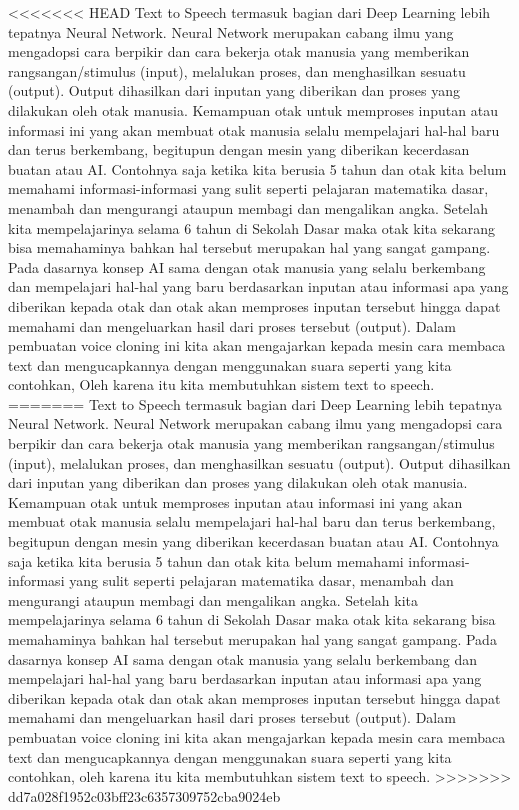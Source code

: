 <<<<<<< HEAD
Text to Speech termasuk bagian dari Deep Learning lebih tepatnya Neural Network\cite{li2017deep}. Neural Network merupakan cabang ilmu yang mengadopsi cara berpikir dan cara bekerja otak manusia yang memberikan rangsangan/stimulus (input), melalukan proses, dan menghasilkan sesuatu (output). Output dihasilkan dari inputan yang diberikan dan proses yang dilakukan oleh otak manusia. Kemampuan otak untuk memproses inputan atau informasi ini yang akan membuat otak manusia selalu mempelajari hal-hal baru dan terus berkembang, begitupun dengan mesin yang diberikan kecerdasan buatan atau AI. Contohnya saja ketika kita berusia 5 tahun dan otak kita belum memahami informasi-informasi yang sulit seperti pelajaran matematika dasar, menambah dan mengurangi ataupun membagi dan mengalikan angka. Setelah kita mempelajarinya selama 6 tahun di Sekolah Dasar maka otak kita sekarang bisa memahaminya bahkan hal tersebut merupakan hal yang sangat gampang. Pada dasarnya konsep AI sama dengan otak manusia yang selalu berkembang dan mempelajari hal-hal yang baru berdasarkan inputan atau informasi apa yang diberikan kepada otak dan otak akan memproses inputan tersebut hingga dapat memahami dan mengeluarkan hasil dari proses tersebut (output).
Dalam pembuatan voice cloning ini kita akan mengajarkan kepada mesin cara membaca text dan mengucapkannya dengan menggunakan suara seperti yang kita contohkan, Oleh karena itu kita membutuhkan sistem text to speech.
=======
Text to Speech termasuk bagian dari Deep Learning lebih tepatnya Neural Network. Neural Network merupakan cabang ilmu yang mengadopsi cara berpikir dan cara bekerja otak manusia yang memberikan rangsangan/stimulus (input), melalukan proses, dan menghasilkan sesuatu (output). Output dihasilkan dari inputan yang diberikan dan proses yang dilakukan oleh otak manusia. Kemampuan otak untuk memproses inputan atau informasi ini yang akan membuat otak manusia selalu mempelajari hal-hal baru dan terus berkembang, begitupun dengan mesin yang diberikan kecerdasan buatan atau AI. Contohnya saja ketika kita berusia 5 tahun dan otak kita belum memahami informasi-informasi yang sulit seperti pelajaran matematika dasar, menambah dan mengurangi ataupun membagi dan mengalikan angka. Setelah kita mempelajarinya selama 6 tahun di Sekolah Dasar maka otak kita sekarang bisa memahaminya bahkan hal tersebut merupakan hal yang sangat gampang. Pada dasarnya konsep AI sama dengan otak manusia yang selalu berkembang dan mempelajari hal-hal yang baru berdasarkan inputan atau informasi apa yang diberikan kepada otak dan otak akan memproses inputan tersebut hingga dapat memahami dan mengeluarkan hasil dari proses tersebut (output).
Dalam pembuatan voice cloning ini kita akan mengajarkan kepada mesin cara membaca text dan mengucapkannya dengan menggunakan suara seperti yang kita contohkan, oleh karena itu kita membutuhkan sistem text to speech.
>>>>>>> dd7a028f1952c03bff23c6357309752cba9024eb


